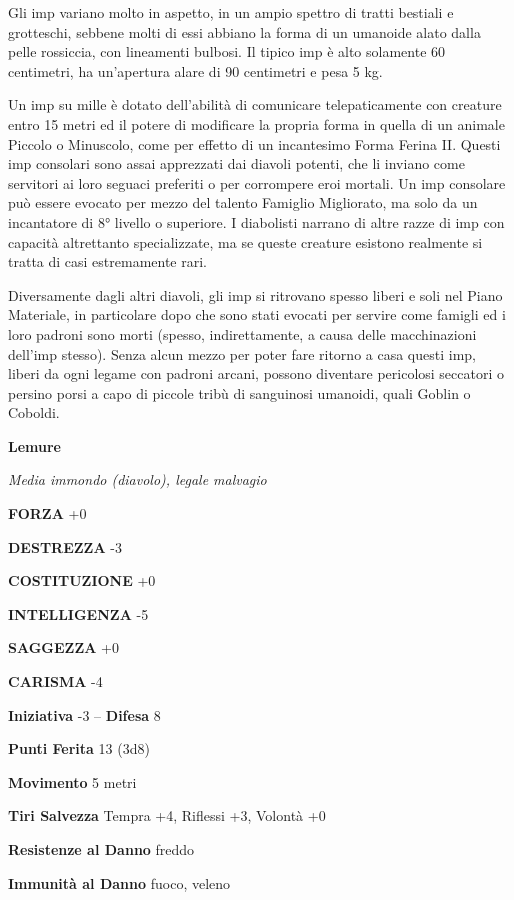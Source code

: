 \begin{multicols}{2}
	Gli imp variano molto in aspetto, in un ampio spettro di tratti bestiali e grotteschi, sebbene molti di essi abbiano la forma di un umanoide alato dalla pelle rossiccia, con lineamenti bulbosi. Il tipico imp è alto solamente 60 centimetri, ha un'apertura alare di 90 centimetri e pesa 5 kg.

	Un imp su mille è dotato dell'abilità di comunicare telepaticamente con creature entro 15 metri ed il potere di modificare la propria forma in quella di un animale Piccolo o Minuscolo, come per effetto di un incantesimo Forma Ferina II. Questi imp consolari sono assai apprezzati dai diavoli potenti, che li inviano come servitori ai loro seguaci preferiti o per corrompere eroi mortali. Un imp consolare può essere evocato per mezzo del talento Famiglio Migliorato, ma solo da un incantatore di 8° livello o superiore. I diabolisti narrano di altre razze di imp con capacità altrettanto specializzate, ma se queste creature esistono realmente si tratta di casi estremamente rari.

	Diversamente dagli altri diavoli, gli imp si ritrovano spesso liberi e soli nel Piano Materiale, in particolare dopo che sono stati evocati per servire come famigli ed i loro padroni sono morti (spesso, indirettamente, a causa delle macchinazioni dell'imp stesso). Senza alcun mezzo per poter fare ritorno a casa questi imp, liberi da ogni legame con padroni arcani, possono diventare pericolosi seccatori o persino porsi a capo di piccole tribù di sanguinosi umanoidi, quali Goblin o Coboldi.


	\medskip{}\textbf{Lemure}

	\textit{Media immondo (diavolo), legale malvagio}

	\textbf{FORZA} +0

	\textbf{DESTREZZA} -3

	\textbf{COSTITUZIONE} +0

	\textbf{INTELLIGENZA} -5

	\textbf{SAGGEZZA} +0

	\textbf{CARISMA} -4

	\textbf{Iniziativa} -3 -- \textbf{Difesa} 8

	\textbf{Punti Ferita} 13 (3d8)

	\textbf{Movimento} 5 metri

	\textbf{Tiri Salvezza} Tempra +4, Riflessi +3, Volontà +0

	\textbf{Resistenze al Danno} freddo

	\textbf{Immunità al Danno} fuoco, veleno


\end{multicols}
